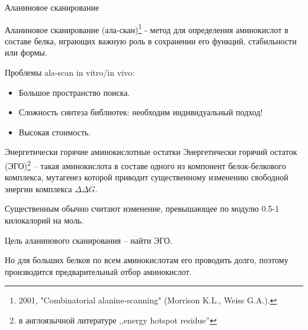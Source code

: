 \documentclass[12pt, xcolor={dvipsnames}]{beamer}
\begin{document}
\begin{frame}{Аланиновое сканирование}

Аланиновое сканирование (ала-скан)\footnote{2001, "Combinatorial alanine-scanning" (Morrison K.L., Weiss G.A.).}  - метод для определения аминокислот в составе белка, играющих важную роль в сохранении его функций, стабильности или формы.
\begin{figure}
\end{figure}

Проблемы ala-scan in vitro/in vivo:
\begin{itemize}
\item Большое пространство поиска.
\item Сложность синтеза библиотек: необходим индивидуальный подход!
\item Высокая стоимость.
\end{itemize}
\end{frame}
\begin{frame}{Энергетически горячие аминокислотные остатки}
Энергетически горячий остаток (ЭГО)\footnote{в англоязычной литературе ,,energy hotspot residue''} -- такая аминокислота в составе одного из компонент белок-белкового комплекса, мутагенез  которой приводит существенному изменению свободной энергии комплекса $\Delta\Delta G$.

Существенным обычно считают изменение, превышающее по модулю 0.5-1 килокалорий на моль.

Цель аланинового сканирования -- найти ЭГО.

Но для больших белков по всем аминокислотам его проводить долго, поэтому производится предварительный отбор аминокислот.
\end{frame}
\end{document}
